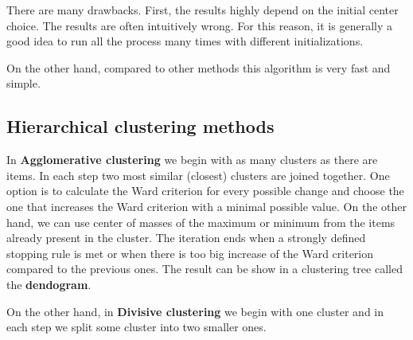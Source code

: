 There are many drawbacks. First, the results highly depend on the initial center choice. The results are often intuitively wrong. For this reason, it is generally a good idea to run all the process many times with different initializations.

On the other hand, compared to other methods this algorithm is very fast and simple.

\subsection{Hierarchical clustering methods}
In \textbf{Agglomerative clustering} we begin with as many clusters as there are items. In each step two most similar (closest) clusters are joined together. One option is to calculate the Ward criterion for every possible change and choose the one that increases the Ward criterion with a minimal possible value. On the other hand, we can use center of masses of the maximum or minimum from the items already present in the cluster. The iteration ends when a strongly defined stopping rule is met or when there is too big increase of the Ward criterion compared to the previous ones. The result can be show in a clustering tree called the \textbf{dendogram}.

On the other hand, in \textbf{Divisive clustering} we begin with one cluster and in each step we split some cluster into two smaller ones.
